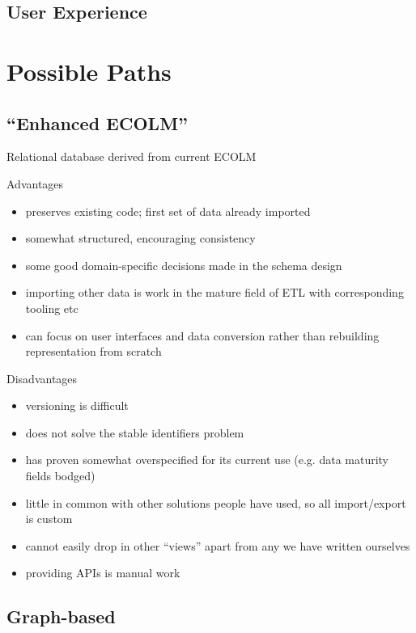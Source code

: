 \documentclass[sigconf, nonacm=true]{acmart}
\begin{document}
\begin{sloppypar}
  
  \subsection{User Experience}

  \section{Possible Paths}\label{future}

  \subsection{``Enhanced ECOLM''}

  Relational database derived from current ECOLM

  Advantages

  \begin{itemize}
  \item preserves existing code; first set of data already imported
  \item somewhat structured, encouraging consistency
  \item some good domain-specific decisions made in the schema design
  \item importing other data is work in the mature field of ETL with
    corresponding tooling etc
  \item can focus on user interfaces and data conversion rather than
    rebuilding representation from scratch
  \end{itemize}

  Disadvantages

  \begin{itemize}
  \item versioning is difficult
  \item does not solve the stable identifiers problem
  \item has proven somewhat overspecified for its current use
    (e.g. data maturity fields bodged)
  \item little in common with other solutions people have used, so all
    import/export is custom
  \item cannot easily drop in other ``views'' apart from any we have
    written ourselves
  \item providing APIs is manual work
  \end{itemize}

  \subsection{Graph-based}


\end{sloppypar}
\end{document}
